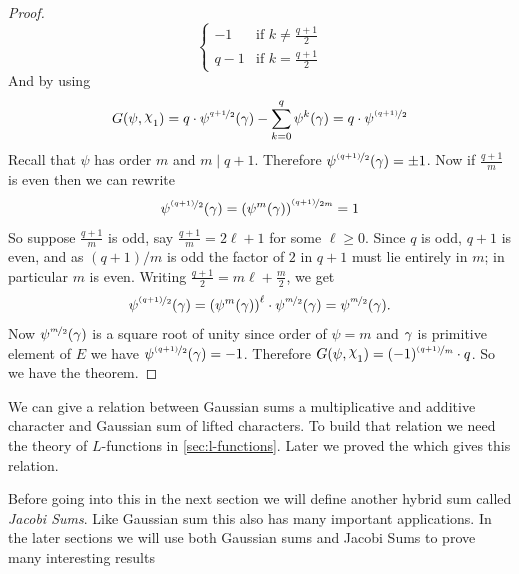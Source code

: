 \begin{proof}
$$\begin{cases}
    -1 & \text{if }k\neq \frac{q+1}2\\
    q-1 & \text{if }k=\frac{q+1}2  
  \end{cases}$$And by using  $$G(\psi,\chi_1) = q\cdot\psi^{\nicefrac{q+1}{2}}(\gm) - \sum_{k=0}^{q}\psi^k(\gm)=q\cdot\psi^{\nicefrac{(q+1)}{2}}$$
  Recall that $\psi$ has order $m$ and $m\mid q+1$. Therefore $\psi^{\nicefrac{(q+1)}{2}}(\gamma)=\pm1$. Now if $\frac{q+1}{m}$ is even then we can rewrite $$\psi^{\nicefrac{(q+1)}{2}}(\gamma)=\left(\psi^m(\gamma)\right)^{\nicefrac{(q+1)}{2m}}=1$$ So suppose $\frac{q+1}{m}$ is odd, say $\frac{q+1}{m}=2\ell+1$ for some $\ell\geq 0$. Since $q$ is odd, $q+1$ is even, and as $(q+1)/m$ is odd the factor of $2$ in $q+1$ must lie entirely in $m$; in particular $m$ is even. Writing $\frac{q+1}{2}=m\ell+\frac{m}{2}$, we get $$\psi^{\nicefrac{(q+1)}{2}}(\gamma)=\left(\psi^m(\gamma)\right)^{\ell}\cdot \psi^{\nicefrac{m}{2}}(\gamma)=\psi^{\nicefrac{m}{2}}(\gamma).$$ Now $\psi^{\nicefrac{m}{2}}(\gamma)$ is a square root of unity since order of $\psi=m$ and $\gamma$ is primitive element of $E$ we have $\psi^{\nicefrac{(q+1)}{2}}(\gamma)=-1$. Therefore $G(\psi,\chi_1)=(-1)^{\nicefrac{(q+1)}{m}}\cdot q$. So we have the theorem. 
\end{proof}

We can give a relation between Gaussian sums a multiplicative and additive character and Gaussian sum of lifted characters. To build that relation we need the theory of $L$-functions in \autoref{sec:l-functions}. Later we proved the \DHthm which gives this relation. 

Before going into this in the next section we will define another hybrid sum called \emph{Jacobi Sums}. Like Gaussian sum this also has many important applications. In the later sections we will use both Gaussian sums and Jacobi Sums to prove many interesting results